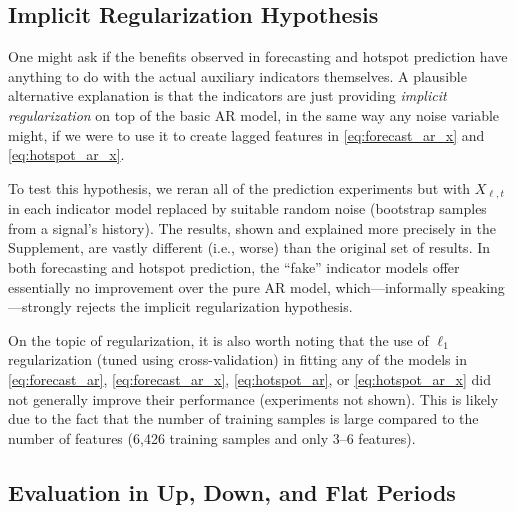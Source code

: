 \documentclass[9pt,twocolumn,twoside,lineno]{pnas-new}
\begin{document}
\subsection{Implicit Regularization Hypothesis}

One might ask if the benefits observed in forecasting and hotspot
prediction have anything to do with the actual auxiliary indicators
themselves. A plausible alternative explanation is that the indicators are
just providing \textit{implicit regularization} on top of the basic AR model,
in the same way any noise variable might, if we were to use it to create lagged
features in \eqref{eq:forecast_ar_x} and \eqref{eq:hotspot_ar_x}.    

To test this hypothesis, we reran all of the prediction experiments but with
$X_{\ell,t}$ in each indicator model replaced by suitable random noise
(bootstrap samples from a signal's history).  The results, shown and explained
more precisely in the Supplement, are vastly different (i.e., worse) than the
original set of results.  In both forecasting and hotspot prediction, the
``fake'' indicator models offer essentially no improvement over the pure AR
model, which---informally speaking---strongly rejects the implicit
regularization hypothesis. 

On the topic of regularization, it is also worth noting that the use of 
$\ell_1$ regularization (tuned using cross-validation) in fitting any of the
models in \eqref{eq:forecast_ar}, \eqref{eq:forecast_ar_x},
\eqref{eq:hotspot_ar}, or  \eqref{eq:hotspot_ar_x} did not generally improve
their performance (experiments not shown).  This is likely due to the fact that
the number of training samples is large compared to the number of features
(6,426 training samples and only 3--6 features).  

\subsection{Evaluation in Up, Down, and Flat Periods}
\end{document}
